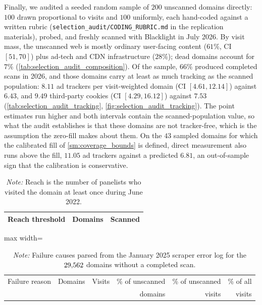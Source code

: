 \documentclass[12pt, letterpaper]{article}
\begin{document}
Finally, we audited a seeded random sample of $200$ unscanned domains directly: $100$ drawn proportional to visits and $100$ uniformly, each hand-coded against a written rubric (\texttt{selection\_audit/CODING\_RUBRIC.md} in the replication materials), probed, and freshly scanned with Blacklight in July 2026. By visit mass, the unscanned web is mostly ordinary user-facing content ($61\%$, CI $[51, 70]$) plus ad-tech and CDN infrastructure ($28\%$); dead domains account for $7\%$ (\cref{tab:selection_audit_composition}). Of the sample, $66\%$ produced completed scans in 2026, and those domains carry at least as much tracking as the scanned population: $8.11$ ad trackers per visit-weighted domain (CI $[4.61, 12.14]$) against $6.43$, and $9.49$ third-party cookies (CI $[4.29, 16.12]$) against $7.53$ (\cref{tab:selection_audit_tracking}, \cref{fig:selection_audit_tracking}). The point estimates run higher and both intervals contain the scanned-population value, so what the audit establishes is that these domains are not tracker-free, which is the assumption the zero-fill makes about them. On the $43$ sampled domains for which the calibrated fill of \cref{sm:coverage_bounds} is defined, direct measurement also runs above the fill, $11.05$ ad trackers against a predicted $6.81$, an out-of-sample sign that the calibration is conservative.
 

\begin{table}[ht]
\centering
\caption{Blacklight scan success by domain reach}
\label{tab:scan_by_reach}
\begin{tabular}{lrr}
\toprule
Reach threshold & Domains & Scanned \\
\midrule

\bottomrule
\end{tabular}
\caption*{\textit{Note:} Reach is the number of panelists who visited the domain at least once during June 2022.}
\end{table}


\begin{table}[ht]
\centering
\caption{Why scans failed}
\label{tab:scan_failure_reasons}
\begin{adjustbox}{max width=\textwidth}
\begin{tabular}{lrrrrr}
\toprule
Failure reason & Domains & Visits & \% of unscanned & \% of unscanned & \% of all \\
& & & domains & visits & visits \\
\midrule

\bottomrule
\end{tabular}
\end{adjustbox}
\caption*{\textit{Note:} Failure causes parsed from the January 2025 scraper error log for the $29{,}562$ domains without a completed scan.}
\end{table}
\end{document}
